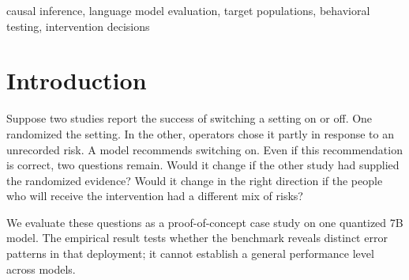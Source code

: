 \begin{abstract}
A model can choose the right intervention by following an irrelevant numerical cue. It can also change its answer when the target population changes but reverse in the wrong direction. We introduce CF-TP1, a synthetic evaluation in which the same displayed rates admit two feasible assignments of randomized and historical evidence. Two target mixtures can require either a switch or an invariant decision. A matched scorecard names the governing table and specifies the arithmetic. In a prospective case study, one Qwen2.5-7B-Instruct Q4\_K\_M deployment completed 4,096 decisions on 128 independently sampled numerical families. On the prespecified transfer form, it answered both target variants correctly in 128/512 causal pairs and 146/512 arithmetic pairs. The family-standardized difference was $-3.52$ percentage points (approximate 95\% interval $-7.77$ to $+0.74$). The primary comparison was inconclusive. In prespecified diagnostics, the model activated in 995/1,024 causal decisions and correctly reversed in 3/256 required target switches. Arithmetic answers changed in 46/256 required switches and 45/256 invariant pairs. Directional scoring thus exposed a preference and unwarranted changes that aggregate accuracy obscured. The findings concern one deployment and two fixed forms. They support the instrument's diagnostic value while leaving causal-specific impairment and internal reasoning mechanisms unresolved.
\end{abstract}
\begin{IEEEkeywords}
causal inference, language model evaluation, target populations, behavioral testing, intervention decisions
\end{IEEEkeywords}

\section{Introduction}
Suppose two studies report the success of switching a setting on or off. One randomized the setting. In the other, operators chose it partly in response to an unrecorded risk. A model recommends switching on. Even if this recommendation is correct, two questions remain. Would it change if the other study had supplied the randomized evidence? Would it change in the right direction if the people who will receive the intervention had a different mix of risks?

We evaluate these questions as a proof-of-concept case study on one quantized 7B model. The empirical result tests whether the benchmark reveals distinct error patterns in that deployment; it cannot establish a general performance level across models.

